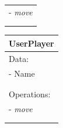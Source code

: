 \documentclass[12pt]{article}
\begin{document}
\begin{enumerate}[1.]
\begin{figure}[H]
\begin{tabular}{|p{3.25cm}|}
            - \textit{move} \\
            \\
            \\
            \hline
        \end{tabular}
        \begin{tabular}{|p{3.25cm}|}
            \hline
            \textbf{UserPlayer}\\
            \hline
            Data:\\
            - Name\\
            \\
            \\
            \hline
            Operations:\\
            - \textit{move} \\
            \\
            \\
            \hline
        \end{tabular}
    \end{figure}

\end{enumerate}
\end{document}
